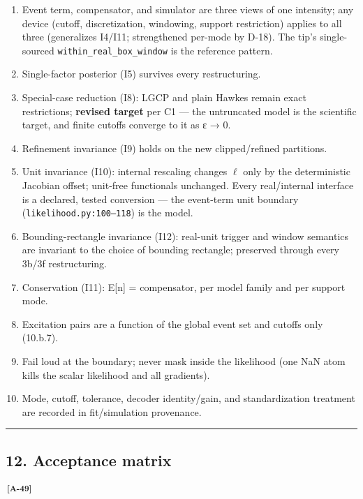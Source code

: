 \documentclass[
  10pt,
]{article}
\providecommand{\tightlist}{%
  \setlength{\itemsep}{0pt}\setlength{\parskip}{0pt}}
\newcommand{\amdref}[1]{{\color{amdcolor}\textsuperscript{\,\textbf{[#1]}}}}
\begin{document}
\begin{enumerate}
\def\labelenumi{\arabic{enumi}.}
\tightlist
\item
  Event term, compensator, and simulator are three views of one intensity; any device (cutoff, discretization, windowing, support restriction) applies to all three (generalizes I4/I11; strengthened per-mode by D-18). The tip's single-sourced \texttt{within\_\allowbreak{}real\_\allowbreak{}box\_\allowbreak{}window} is the reference pattern.
\item
  Single-factor posterior (I5) survives every restructuring.
\item
  Special-case reduction (I8): LGCP and plain Hawkes remain exact restrictions; \textbf{revised target} per C1 --- the untruncated model is the scientific target, and finite cutoffs converge to it as ε → 0.
\item
  Refinement invariance (I9) holds on the new clipped/refined partitions.
\item
  Unit invariance (I10): internal rescaling changes \(\ell\) only by the deterministic Jacobian offset; unit-free functionals unchanged. Every real/internal interface is a declared, tested conversion --- the event-term unit boundary (\texttt{likelihood.py:100–118}) is the model.
\item
  Bounding-rectangle invariance (I12): real-unit trigger and window semantics are invariant to the choice of bounding rectangle; preserved through every 3b/3f restructuring.
\item
  Conservation (I11): E{[}n{]} = compensator, per model family and per support mode.
\item
  Excitation pairs are a function of the global event set and cutoffs only (10.b.7).
\item
  Fail loud at the boundary; never mask inside the likelihood (one NaN atom kills the scalar likelihood and all gradients).
\item
  Mode, cutoff, tolerance, decoder identity/gain, and standardization treatment are recorded in fit/simulation provenance.
\end{enumerate}

\begin{center}\rule{0.5\linewidth}{0.5pt}\end{center}

\hypertarget{acceptance-matrix}{%
\subsection{12. Acceptance matrix}\label{acceptance-matrix}}
\amdref{A-49}
\end{document}
